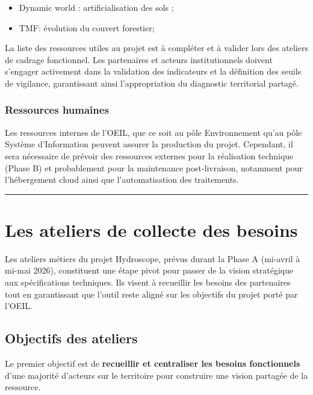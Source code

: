 \documentclass[
  french,
  11pt,
]{article}
\providecommand{\tightlist}{%
  \setlength{\itemsep}{0pt}\setlength{\parskip}{0pt}}
\begin{document}
\begin{itemize}
\tightlist
\item
  Dynamic world : artificialisation des sols ;
\item
  TMF: évolution du couvert forestier;
\end{itemize}

La liste des ressources utiles au projet est à compléter et à valider
lors des ateliers de cadrage fonctionnel. Les partenaires et acteurs
institutionnels doivent s'engager activement dans la validation des
indicateurs et la définition des seuils de vigilance, garantissant ainsi
l'appropriation du diagnostic territorial partagé.

\subsubsection{Ressources humaines}\label{ressources-humaines}

Les ressources internes de l'OEIL, que ce soit au pôle Environnement
qu'au pôle Système d'Information peuvent assurer la production du
projet. Cependant, il sera nécessaire de prévoir des ressources externes
pour la réalisation technique (Phase B) et probablement pour la
maintenance post-livraison, notamment pour l'hébergement cloud ainsi que
l'automatisation des traitements.

\begin{center}\rule{0.5\linewidth}{0.5pt}\end{center}

\newpage{}

\section{Les ateliers de collecte des besoins}\label{sec-ateliers}

Les ateliers métiers du projet Hydroscope, prévus durant la Phase A
(mi-avril à mi-mai 2026), constituent une étape pivot pour passer de la
vision stratégique aux spécifications techniques. Ils visent à
recueillir les besoins des partenaires tout en garantissant que l'outil
reste aligné sur les objectifs du projet porté par l'OEIL.

\subsection{Objectifs des ateliers}\label{objectifs-des-ateliers}

Le premier objectif est de \textbf{recueillir et centraliser les besoins
fonctionnels} d'une majorité d'acteurs sur le territoire pour construire
une vision partagée de la ressource.
\end{document}
